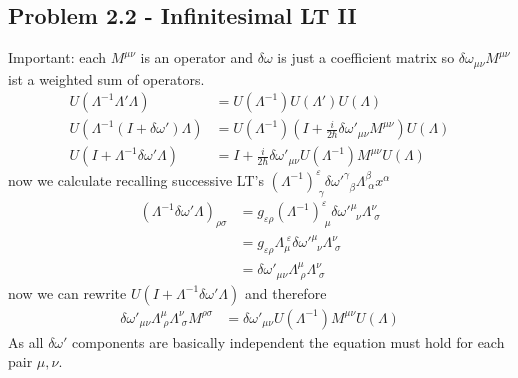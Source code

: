 \documentclass[10pt,a4paper]{book}
\theoremstyle{definition}
\begin{document}
\subsection{Problem 2.2 - Infinitesimal LT II}
Important: each $M^{\mu\nu}$ is an operator and $\delta\omega$ is just a coefficient matrix so $\delta\omega _{\mu\nu}M^{\mu\nu}$ ist a weighted sum of operators.
\begin{align}
U(\Lambda^{-1}\Lambda'\Lambda)&=U(\Lambda^{-1})U(\Lambda')U(\Lambda)\\
U(\Lambda^{-1}(I+\delta\omega')\Lambda)&=U(\Lambda^{-1})\left(I+\frac{i}{2\hbar}\delta\omega'_{\mu\nu}M^{\mu\nu}\right)U(\Lambda)\\
U(I+\Lambda^{-1}\delta\omega'\Lambda)&=I+\frac{i}{2\hbar}\delta\omega'_{\mu\nu}U(\Lambda^{-1})M^{\mu\nu}U(\Lambda)
\end{align}
now we calculate recalling successive LT's $(\Lambda^{-1})^{\varepsilon}_{\;\gamma}\delta\omega'^\gamma_{\;\;\beta}\Lambda^\beta_{\;\alpha}x^\alpha$
\begin{align}
(\Lambda^{-1}\delta\omega'\Lambda)_{\rho\sigma}
&=g_{\varepsilon\rho}(\Lambda^{-1})^{\varepsilon}_{\;\mu}\delta\omega'^\mu_{\;\;\nu}\Lambda^\nu_{\;\sigma}\\
&=g_{\varepsilon\rho}\Lambda^{\;\varepsilon}_{\mu}\delta\omega'^\mu_{\;\;\nu}\Lambda^\nu_{\;\sigma}\\
&=\delta\omega'_{\mu\nu}\Lambda^{\mu}_{\;\rho}\Lambda^\nu_{\;\sigma}
\end{align}
now we can rewrite $U(I+\Lambda^{-1}\delta\omega'\Lambda)$ and therefore
\begin{align}
\delta\omega'_{\mu\nu}\Lambda^{\mu}_{\;\rho}\Lambda^\nu_{\;\sigma}M^{\rho\sigma}&=\delta\omega'_{\mu\nu}U(\Lambda^{-1})M^{\mu\nu}U(\Lambda)
\end{align}
As all $\delta\omega'$ components are basically independent the equation must hold for each pair $\mu,\nu$.
\end{document}
